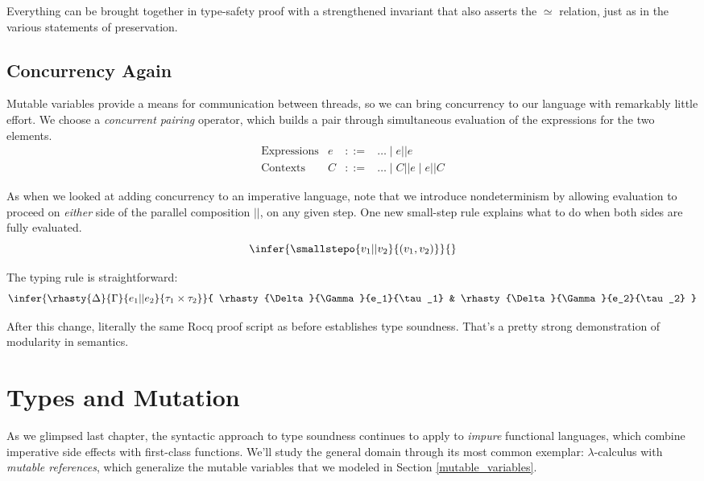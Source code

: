 \documentclass{amsbook}
\theoremstyle{definition}
\theoremstyle{remark}
\numberwithin{section}{chapter}
\numberwithin{equation}{chapter}
\begin{document}
Everything can be brought together in type-safety proof with a strengthened invariant that also asserts the $\simeq$ relation, just as in the various statements of preservation.

\section{Concurrency Again}

Mutable variables provide a means for communication between threads, so we can bring concurrency to our language with remarkably little effort.
We choose a \emph{concurrent pairing} operator, which builds a pair through simultaneous evaluation of the expressions for the two elements.
$$\begin{array}{rrcl}
  \textrm{Expressions} & e &::=& \ldots \mid e || e \\
  \textrm{Contexts} & C &::=& \ldots \mid C || e \mid e || C
\end{array}$$

As when we looked at adding concurrency to an imperative language, note that we introduce nondeterminism by allowing evaluation to proceed on \emph{either} side of the parallel composition $||$, on any given step.
One new small-step rule explains what to do when both sides are fully evaluated.
$$\infer{\smallstepo{v_1 || v_2}{(v_1, v_2)}}{}$$

The typing rule is straightforward:
$$\infer{\rhasty{\Delta}{\Gamma}{e_1 || e_2}{\tau_1 \times \tau_2}}{
  \rhasty{\Delta}{\Gamma}{e_1}{\tau_1}
  & \rhasty{\Delta}{\Gamma}{e_2}{\tau_2}
}$$

After this change, literally the same Rocq proof script as before establishes type soundness.
That's a pretty strong demonstration of modularity in semantics.



\chapter{Types and Mutation}

As we glimpsed last chapter, the syntactic approach to type soundness continues to apply to \emph{impure} functional languages, which combine imperative side effects with first-class functions.
We'll study the general domain through its most common exemplar: $\lambda$-calculus with \emph{mutable references}, which generalize the mutable variables that we modeled in Section \ref{mutable_variables}.
\end{document}
